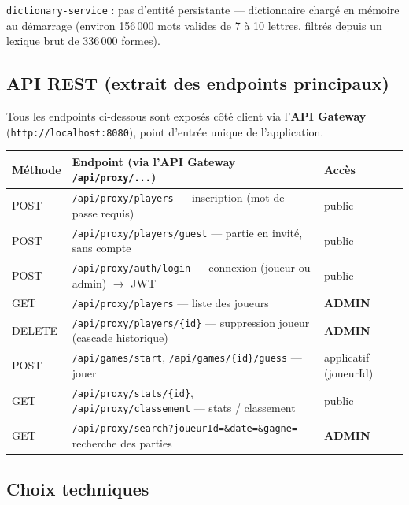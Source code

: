 \documentclass[a4paper,11pt]{article}
\begin{document}
\texttt{dictionary-service} : pas d'entit\'e persistante --- dictionnaire charg\'e en m\'emoire au d\'emarrage (environ 156\,000 mots valides de 7 \`a 10 lettres, filtr\'es depuis un lexique brut de 336\,000 formes).

\subsection{API REST (extrait des endpoints principaux)}

Tous les endpoints ci-dessous sont expos\'es c\^ot\'e client via l'\textbf{API Gateway} (\texttt{http://localhost:8080}), point d'entr\'ee unique de l'application.

\begin{longtable}{@{}p{1.3cm}p{9cm}p{2.5cm}@{}}
\toprule
\textbf{M\'ethode} & \textbf{Endpoint (via l'API Gateway \texttt{/api/proxy/...})} & \textbf{Acc\`es} \\
\midrule
\endhead
POST & \texttt{/api/proxy/players} --- inscription (mot de passe requis) & public \\
POST & \texttt{/api/proxy/players/guest} --- partie en invit\'e, sans compte & public \\
POST & \texttt{/api/proxy/auth/login} --- connexion (joueur ou admin) $\rightarrow$ JWT & public \\
GET & \texttt{/api/proxy/players} --- liste des joueurs & \textbf{ADMIN} \\
DELETE & \texttt{/api/proxy/players/\{id\}} --- suppression joueur (cascade historique) & \textbf{ADMIN} \\
POST & \texttt{/api/games/start}, \texttt{/api/games/\{id\}/guess} --- jouer & applicatif (joueurId) \\
GET & \texttt{/api/proxy/stats/\{id\}}, \texttt{/api/proxy/classement} --- stats / classement & public \\
GET & \texttt{/api/proxy/search?joueurId=\&date=\&gagne=} --- recherche des parties & \textbf{ADMIN} \\
\bottomrule
\end{longtable}

\subsection{Choix techniques}
\end{document}
